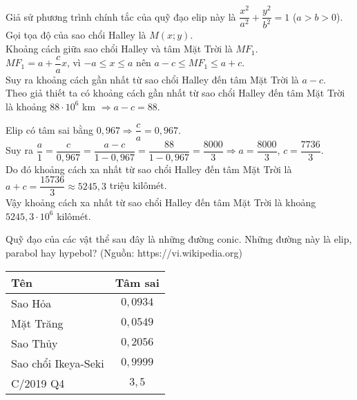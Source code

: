 \begin{bt}
{\begin{listEX}
Giả sử phương trình chính tắc của quỹ đạo elip này là $ \dfrac{x^2}{a^2} +\dfrac{y^2}{b^2}=1$ ($ a>b>0 $).\\
Gọi tọa độ của sao chổi Halley là $ M(x;y) $.\\
Khoảng cách giữa sao chổi Halley và tâm Mặt Trời là $ MF_1 $.\\
$ MF_1=a+\dfrac{c}{a}x $, vì $ -a\leq x\leq a $ nên $ a-c\leq MF_1\leq a+c $.\\
Suy ra khoảng cách gần nhất từ sao chổi Halley đến tâm Mặt Trời là $ a-c$.\\
Theo giả thiết ta có khoảng cách gần nhất từ sao chổi Halley đến tâm Mặt Trời là khoảng $ 88\cdot 10^6 $ km $ \Rightarrow a-c=88 $.
\item Elip có tâm sai bằng $ 0{,}967 \Rightarrow \dfrac{c}{a}=0{,}967$.\\
Suy ra $ \dfrac{a}{1}=\dfrac{c}{0{,}967}=\dfrac{a-c}{1-0{,}967}=\dfrac{88}{1-0{,}967}=\dfrac{8000}{3} \Rightarrow a=\dfrac{8000}{3} $, $ c=\dfrac{7736}{3} $.\\
Do đó khoảng cách xa nhất từ sao chổi Halley đến tâm Mặt Trời là $ a+c=\dfrac{15736}{3} \approx 5245{,}3$ triệu kilômét.\\
Vậy khoảng cách xa nhất từ sao chổi Halley đến tâm Mặt Trời là khoảng $ 5245{,}3\cdot 10^6 $ kilômét.
\end{listEX}
}
\end{bt}
\begin{bt}%
Quỹ đạo của các vật thể sau đây là những đường conic. Những đường này là elip, parabol hay hypebol? (Nguồn: https://vi.wikipedia.org)
\begin{center}
\begin{tabular}{|l|c|}
	\hline 
	\centering Tên & Tâm sai \\
	\hline 
	Sao Hỏa  & $ 0{,}0934$ \\
	\hline
	Mặt Trăng & $ 0{,}0549 $ \\
	\hline
	Sao Thủy & $ 0{,}2056 $ \\
	\hline
	Sao chổi Ikeya-Seki & $ 0{,}9999 $ \\
	\hline
	C/2019 Q4 & $ 3{,}5 $ \\
	\hline
\end{tabular}
\end{center}
\end{bt}